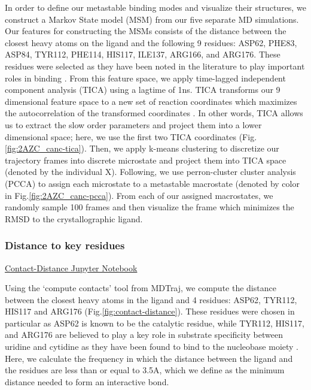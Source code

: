 \documentclass[fleqn,10pt]{wlscirep}
\begin{document}
In order to define our metastable binding modes and visualize their structures, we construct a Markov State model (MSM) \cite{} from our five separate MD simulations.
Our features for constructing the MSMs consists of the distance between the closest heavy atoms on the ligand and the following 9 residues: ASP62, PHE83, ASP84, TYR112, PHE114, HIS117, ILE137, ARG166, and ARG176.
These residues were selected as they have been noted in the literature to play important roles in binding \cite{tanaka}.
From this feature space, we apply time-lagged independent component analysis (TICA) using a lagtime of 1ns.
TICA transforms our 9 dimensional feature space to a new set of reaction coordinates which maximizes the autocorrelation of the transformed coordinates \cite{}.
In other words, TICA allows us to extract the slow order parameters and project them into a lower dimensional space; here, we use the first two TICA coordinates (Fig. \ref{fig:2AZC_canc-tica}).
Then, we apply k-means clustering to discretize our trajectory frames into discrete microstate and project them into TICA space (denoted by the individual X).
Following, we use perron-cluster cluster analysis (PCCA) \cite{} to assign each microstate to a metastable macrostate (denoted by color in Fig.\ref{fig:2AZC_canc-pcca}).
From each of our assigned macrostates, we randomly sample 100 frames and then visualize the frame which minimizes the RMSD to the crystallographic ligand.

\subsubsection{Distance to key residues}

\href{https://github.com/nathanmlim/Spitale/blob/master/manual_md/notebooks/contact-distance.ipynb}{Contact-Distance Jupyter Notebook}

Using the `compute contacts' tool from MDTraj, we compute the distance between the closest heavy atoms in the ligand and 4 residues: ASP62, TYR112, HIS117 and ARG176 (Fig.\ref{fig:contact-distance}).
These residues were chosen in particular as ASP62 is known to be the catalytic residue, while TYR112, HIS117, and ARG176 are believed to play a key role in substrate specificity between uridine and cytidine as they have been found to bind to the nucleobase moiety \cite{tanaka}.
Here, we calculate the frequency in which the distance between the ligand and the residues are less than or equal to 3.5A, which we define as the minimum distance needed to form an interactive bond.
\end{document}
